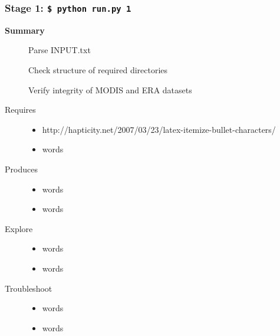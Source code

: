 \documentclass[twoside,a4paper]{refart}
\begin{document}
\subsubsection{\textbf{Stage 1:} \texttt{\$ python run.py 1}}
  \begin{description}
    \item [\textbf{Summary}]
          Parse INPUT.txt
        
          Check structure of required directories
        
          Verify integrity of MODIS and ERA datasets
\\
      
    \item [Requires]
      \begin{itemize}
        \item
          http://hapticity.net/2007/03/23/latex-itemize-bullet-characters/
        \item
          words
\\
      \end{itemize}
  
  
    \item [Produces]
      \begin{itemize}
        \item
          words
        \item
          words
\\
      \end{itemize}
      
    \item [Explore]
      \begin{itemize}
        \item
          words
        \item
          words
\\
      \end{itemize}

    \item [Troubleshoot]
      \begin{itemize}
        \item
          words
        \item
          words
\\
      \end{itemize}
  \end{description}
  
\end{document}
